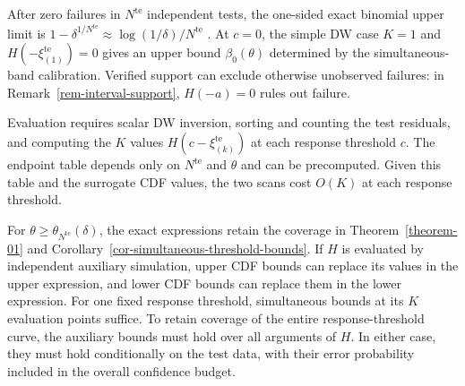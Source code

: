 \documentclass[review,11pt,3p,authoryear,nopreprintline]{elsarticle}
\begin{document}
After zero failures in $N^{\mathrm{te}}$ independent tests, the one-sided exact binomial upper limit is $1-\delta^{1/N^{\mathrm{te}}}\approx\log(1/\delta)/N^{\mathrm{te}}$ \citep{C.P34}. At $c=0$, the simple DW case $K=1$ and $H\left(-\xi_{(1)}^{\mathrm{te}}\right)=0$ gives an upper bound $\beta_0(\theta)$ determined by the simultaneous-band calibration. Verified support can exclude otherwise unobserved failures: in Remark~\ref{rem-interval-support}, $H(-a)=0$ rules out failure.

Evaluation requires scalar DW inversion, sorting and counting the test residuals, and computing the $K$ values $H\left(c-\xi_{(k)}^{\mathrm{te}}\right)$ at each response threshold $c$. The endpoint table depends only on $N^{\mathrm{te}}$ and $\theta$ and can be precomputed. Given this table and the surrogate CDF values, the two scans cost $O(K)$ at each response threshold.

For $\theta\ge\theta_{N^{\mathrm{te}}}(\delta)$, the exact expressions retain the coverage in Theorem~\ref{theorem-01} and Corollary~\ref{cor-simultaneous-threshold-bounds}. If $H$ is evaluated by independent auxiliary simulation, upper CDF bounds can replace its values in the upper expression, and lower CDF bounds can replace them in the lower expression. For one fixed response threshold, simultaneous bounds at its $K$ evaluation points suffice. To retain coverage of the entire response-threshold curve, the auxiliary bounds must hold over all arguments of $H$. In either case, they must hold conditionally on the test data, with their error probability included in the overall confidence budget.
\end{document}
